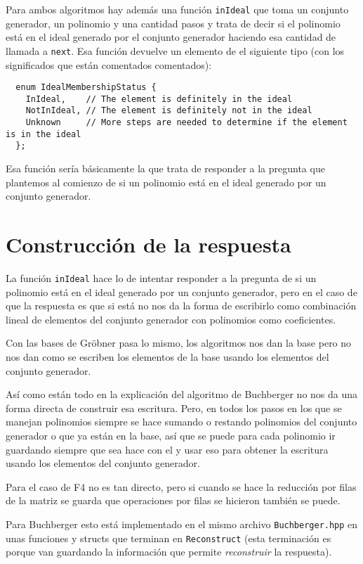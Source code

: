 \documentclass{report}
\theoremstyle{customstyle}
\theoremstyle{factstyle}
\begin{document}
Para ambos algoritmos hay además una función \texttt{inIdeal} que toma un conjunto generador, un polinomio y una cantidad pasos y trata de decir si el polinomio está en el ideal generado por el conjunto generador haciendo esa cantidad de llamada a \texttt{next}. Esa función devuelve un elemento de el siguiente tipo (con los significados que están comentados comentados):

\begin{verbatim}
  enum IdealMembershipStatus {
    InIdeal,    // The element is definitely in the ideal
    NotInIdeal, // The element is definitely not in the ideal
    Unknown     // More steps are needed to determine if the element is in the ideal
  };
\end{verbatim}

Esa función sería básicamente la que trata de responder a la pregunta que plantemos al comienzo de si un polinomio está en el ideal generado por un conjunto generador.

\section{Construcción de la respuesta}

La función \texttt{inIdeal} hace lo de intentar responder a la pregunta de si un polinomio está en el ideal generado por un conjunto generador, pero en el caso de que la respuesta es que si está no nos da la forma de escribirlo como combinación lineal de elementos del conjunto generador con polinomios como coeficientes.

Con las bases de Gröbner pasa lo mismo, los algoritmos nos dan la base pero no nos dan como se escriben los elementos de la base usando los elementos del conjunto generador.

Así como están todo en la explicación del algoritmo de Buchberger no nos da una forma directa de construir esa escritura. Pero, en todos los pasos en los que se manejan polinomios siempre se hace sumando o restando polinomios del conjunto generador o que ya están en la base, así que se puede para cada polinomio ir guardando siempre que sea hace con el y usar eso para obtener la escritura usando los elementos del conjunto generador.

Para el caso de F4 no es tan directo, pero si cuando se hace la reducción por filas de la matriz se guarda que operaciones por filas se hicieron también se puede.

Para Buchberger esto está implementado en el mismo archivo \texttt{Buchberger.hpp} en unas funciones y structs que terminan en \texttt{Reconstruct} (esta terminación es porque van guardando la información que permite \emph{reconstruir} la respuesta).
\end{document}
